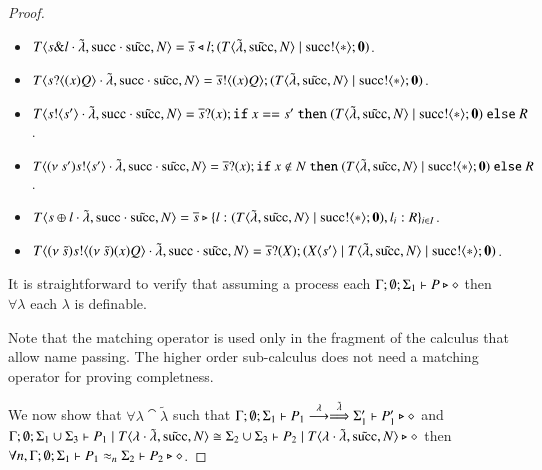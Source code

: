 \begin{proof}
\begin{itemize}
		\item	$T\langle s \& l \cdot \tilde{\lambda}, \textrm{succ} \cdot \tilde{\textrm{succ}}, N \rangle = \overline{s} \triangleleft l ; (T\langle \tilde{\lambda}, \tilde{\textrm{succ}}, N \rangle \;|\; \textrm{succ} ! \langle \ast \rangle ; \mathbf{0})$.

		\item	$T\langle s ? \langle (x)Q \rangle \cdot \tilde{\lambda}, \textrm{succ} \cdot \tilde{\textrm{succ}}, N \rangle = \overline{s} ! \langle (x)Q \rangle ; (T\langle \tilde{\lambda}, \tilde{\textrm{succ}}, N \rangle \;|\; \textrm{succ} ! \langle \ast \rangle ; \mathbf{0})$.

		\item	$T\langle s ! \langle s' \rangle \cdot \tilde{\lambda}, \textrm{succ} \cdot \tilde{\textrm{succ}}, N \rangle = \overline{s} ? (x) ; \mathtt{if}\  x == s'\ \mathtt{then}\  (T\langle \tilde{\lambda}, \tilde{\textrm{succ}}, N \rangle \;|\; \textrm{succ} ! \langle \ast \rangle ; \mathbf{0})\  \mathtt{else}\  R$.

		\item	$T\langle (\nu\ s') s ! \langle s' \rangle \cdot \tilde{\lambda}, \textrm{succ} \cdot \tilde{\textrm{succ}}, N \rangle = \overline{s} ? (x) ; \mathtt{if}\  x \notin N\ \mathtt{then}\  (T\langle \tilde{\lambda}, \tilde{\textrm{succ}}, N \rangle \;|\; \textrm{succ} ! \langle \ast \rangle ; \mathbf{0})\  \mathtt{else}\  R$.

		\item	$T\langle s \oplus l \cdot \tilde{\lambda}, \textrm{succ} \cdot \tilde{\textrm{succ}}, N \rangle = \overline{s} \triangleright \{l:(T\langle \tilde{\lambda}, \tilde{\textrm{succ}}, N \rangle \;|\; \textrm{succ} ! \langle \ast \rangle ; \mathbf{0}), l_i: R\}_{i \in I}$.

		\item	$T\langle (\nu\ \tilde{s}) s ! \langle (\nu\ \tilde{s}) (x)Q \rangle \cdot \tilde{\lambda}, \textrm{succ} \cdot \tilde{\textrm{succ}}, N \rangle = \overline{s} ? (X) ; (X\langle s' \rangle \;|\; T\langle \tilde{\lambda}, \tilde{\textrm{succ}}, N \rangle \;|\; \textrm{succ} ! \langle \ast \rangle ; \mathbf{0})$. 
	\end{itemize}

	It is straightforward to verify that assuming a process each $\Gamma; \emptyset; \Sigma_1 \vdash P \triangleright \diamond$ then $\forall \lambda$ each $\lambda$ is definable.

	Note that the matching operator is used only in the fragment of
	the calculus that allow name passing. The higher order sub-calculus
	does not need a matching operator for proving completness.

	We now show that $\forall \lambda \cat \tilde{\lambda}$ such that $\Gamma; \emptyset; \Sigma_1 \vdash P_1 \stackrel{\lambda}{\longrightarrow} \stackrel{\tilde{\lambda}}{\Longrightarrow} \Sigma_1' \vdash P_1' \triangleright \diamond$
	and $\Gamma; \emptyset; \Sigma_1 \cup \Sigma_3 \vdash P_1 \;|\; T\langle \lambda \cdot \tilde{\lambda}, \tilde{\textrm{succ}}, N \rangle \cong \Sigma_2 \cup \Sigma_3 \vdash P_2 \;|\; T\langle \lambda \cdot \tilde{\lambda}, \tilde{\textrm{succ}}, N \rangle \triangleright \diamond$ then $\forall n, \Gamma; \emptyset; \Sigma_1 \vdash P_1 \approx_n \Sigma_2 \vdash P_2 \triangleright \diamond$.


\end{proof}
